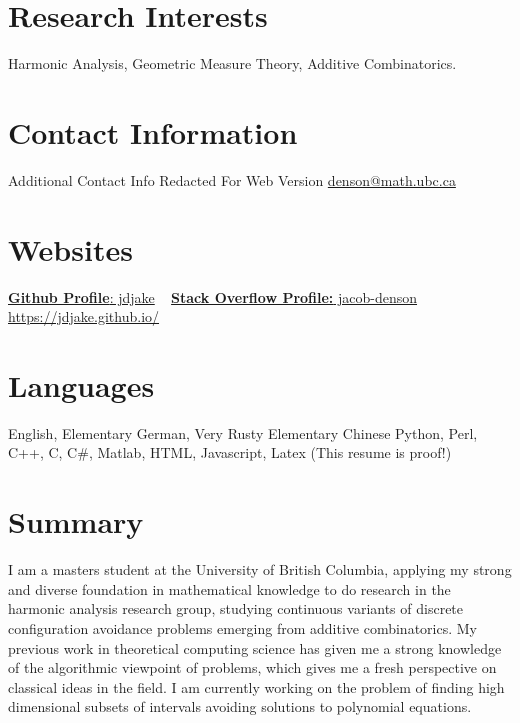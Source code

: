 \documentclass{friggeri-cv} %
\begin{document}


\begin{aside} %
\section{Research Interests}
Harmonic Analysis, Geometric Measure Theory, Additive Combinatorics.
\section{Contact Information}
Additional Contact Info Redacted For Web Version
\href{mailto:denson@math.ubc.ca}{denson@math.ubc.ca}
\section{Websites}
\href{https://github.com/jdjake}{{\bf Github Profile}: jdjake}
~
\href{http://stackoverflow.com/users/2601483/jacob-denson}{{\bf Stack Overflow Profile:} jacob-denson}
~
\href{https://jdjake.github.io/}{https://jdjake.github.io/}
\section{Languages}
English, Elementary German, Very Rusty Elementary Chinese
Python, Perl, C++, C, C\#, Matlab, HTML, Javascript, Latex (This resume is proof!)
\end{aside}


\section{Summary}

I am a masters student at the University of British Columbia, applying my strong and diverse foundation in mathematical knowledge to do research in the harmonic analysis research group, studying continuous variants of discrete configuration avoidance problems emerging from additive combinatorics. My previous work in theoretical computing science has given me a strong knowledge of the algorithmic viewpoint of problems, which gives me a fresh perspective on classical ideas in the field. I am currently working on the problem of finding high dimensional subsets of intervals avoiding solutions to polynomial equations.
\end{document}
